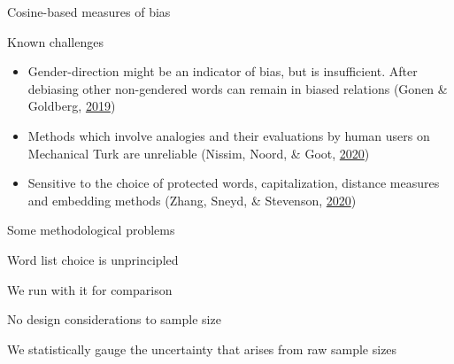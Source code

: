 \documentclass[10pt,ignorenonframetext,x11names, dvipsnames, bibspacing,natbib]{beamer}
\begin{document}
\begin{frame}{Cosine-based measures of bias}

\begin{block}{Known challenges}

\begin{itemize}
\item
  Gender-direction might be an indicator of bias, but is insufficient.
  After debiasing other non-gendered words can remain in biased
  relations (Gonen \& Goldberg,
  \protect\hyperlink{ref-Gonen2019lipstick}{2019})
\item
  Methods which involve analogies and their evaluations by human users
  on Mechanical Turk are unreliable (Nissim, Noord, \& Goot,
  \protect\hyperlink{ref-Nissim2020fair}{2020})
\item
  Sensitive to the choice of protected words, capitalization, distance
  measures and embedding methods (Zhang, Sneyd, \& Stevenson,
  \protect\hyperlink{ref-zhang2020robustness}{2020})
\end{itemize}

\end{block}

\end{frame}

\begin{frame}{Some methodological problems}

\begin{block}{Word list choice is unprincipled}

We run with it for comparison

\pause

\end{block}

\begin{block}{No design considerations to sample size}

We statistically gauge the uncertainty that arises from raw sample sizes

\end{block}

\end{frame}
\end{document}
